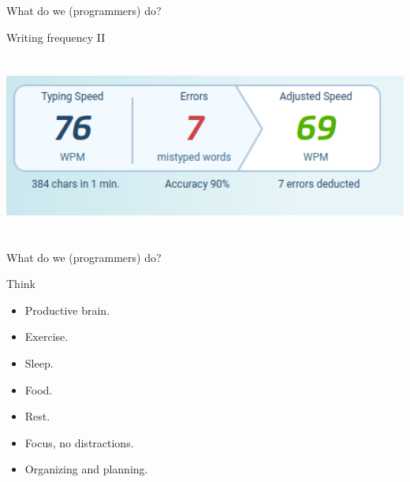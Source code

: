 \begin{frame}{What do we (programmers) do?}
  \begin{block}{Writing frequency II}
    \begin{center}
      \includegraphics[height=6cm]{img/my-typing-02.png}
    \end{center}
  \end{block}
\end{frame}

\begin{frame}{What do we (programmers) do?}
  \begin{block}{Think}
    \begin{itemize}
      \item Productive brain. 
      \item Exercise. %
      \item Sleep. %
      \item Food. %
      \item Rest. %
      \item Focus, no distractions. %
      \item Organizing and planning. %
    \end{itemize}
  \end{block}
\end{frame}


